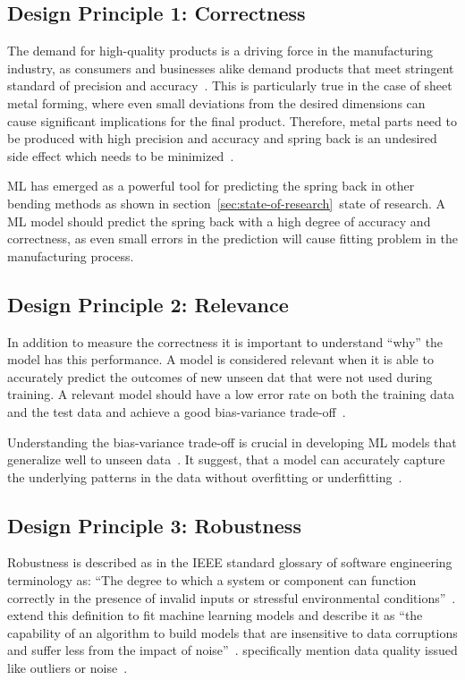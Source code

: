 \subsection*{Design Principle 1: Correctness}\label{correctness}

The demand for high-quality products is a driving force in the manufacturing industry,
as consumers and businesses alike demand products that meet stringent standard of
precision and accuracy~\cite[p. 1]{cruz_applicationmachinelearning_2021}.
This is particularly true in the case of sheet metal forming, where even small
deviations from the desired dimensions can cause significant implications for the final
product.
Therefore, metal parts need to be produced with high precision and accuracy and
spring back is an undesired side effect which needs to be
minimized~\cite[p.1]{cruz_applicationmachinelearning_2021}.

\ac{ML} has emerged as a powerful tool for predicting the spring back in other bending
methods as shown in section~\ref{sec:state-of-research}~state of research.
A \ac{ML} model should predict the spring back with a high degree of accuracy and
correctness, as even small errors in the prediction will cause fitting problem in the
manufacturing process.

\subsection*{Design Principle 2: Relevance}
In addition to measure the correctness it is important to understand ``why''
the model has this performance.
A model is considered relevant when it is able to accurately predict the outcomes of
new unseen dat that were not used during training.
A relevant model should have a low error rate on both the training data and the test
data and achieve a good bias-variance trade-off~\cite[p. 16]{siebert2022construction}.

Understanding the bias-variance trade-off is crucial in developing \ac{ML} models that
generalize well to unseen data~\cite[p. 49--51]{zhou_machinelearning_2021}.
It suggest, that a model can accurately capture the underlying patterns in the data
without overfitting or underfitting~\cite[p. 49--51]{zhou_machinelearning_2021}.

\subsection*{Design Principle 3: Robustness}
Robustness is described as in the IEEE standard glossary of software engineering terminology as:
``The degree to which a system or component can function correctly in the presence of
invalid inputs or stressful environmental conditions''~\cite[p. 64]{terminology1990ieee}.
\cite{saez2016evaluating} extend this definition to fit machine learning
models and describe it as ``the capability of an algorithm to build models that are insensitive to
data corruptions and suffer less from the impact of noise''~\cite[p. 2]{saez_evaluatingclassifierbehavior_2016}.
\cite{siebert2022construction} specifically mention data quality issued like
outliers or noise~\cite[p. 16]{siebert2022construction}.

